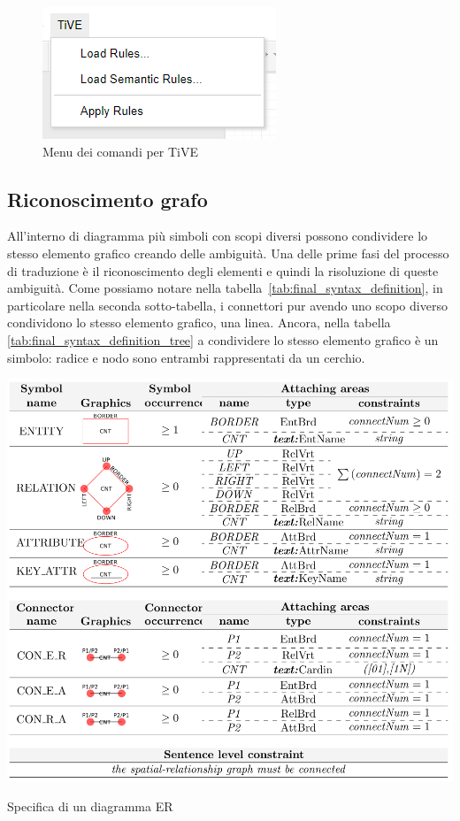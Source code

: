             \begin{figure}[htbp]
                \centering
                \includegraphics[]{Figure/tive_menu.PNG}
                \caption{Menu dei comandi per TiVE}
                \label{fig:tivemenu}
            \end{figure}

        \subsection{Riconoscimento grafo}
            All'interno di diagramma più simboli con scopi diversi possono condividere lo stesso elemento grafico creando delle ambiguità. Una delle prime fasi del processo di traduzione è il riconoscimento degli elementi e quindi la risoluzione di queste ambiguità. Come possiamo notare nella tabella~\ref{tab:final_syntax_definition}, in particolare nella seconda sotto-tabella, i connettori pur avendo uno scopo diverso condividono lo stesso elemento grafico, una linea.
            \newline
            Ancora, nella tabella \ref{tab:final_syntax_definition_tree} a condividere lo stesso elemento grafico è un simbolo: radice e nodo sono entrambi rappresentati da un cerchio.

            \begin{table}[htbp]
                \centering
                \includegraphics[scale=0.4]{Figure/final_syntax_definition.PNG}
                \caption{Specifica di un diagramma ER}
                \label{tab:final_syntax_definition}
            \end{table}

